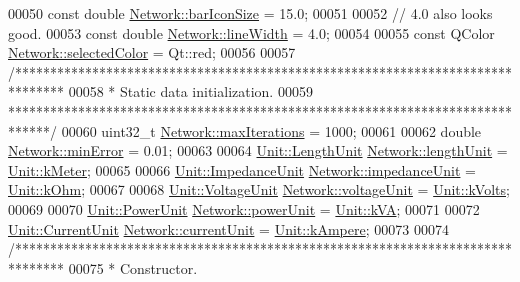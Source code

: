 \begin{DoxyCode}
00050 \textcolor{keyword}{const} \textcolor{keywordtype}{double} \hyperlink{group___models_gaa334bbc93b3fde219840e95e23198b53}{Network::barIconSize} = 15.0;
00051 
00052 \textcolor{comment}{// 4.0 also looks good.}
00053 \textcolor{keyword}{const} \textcolor{keywordtype}{double} \hyperlink{group___models_ga3f810634c9908d62d33a1ab09a76c147}{Network::lineWidth} = 4.0;
00054 
00055 \textcolor{keyword}{const} QColor \hyperlink{group___models_gaa9e21b8e2a24b0495e776a51e1aeed94}{Network::selectedColor} = Qt::red;
00056 
00057 \textcolor{comment}{/*******************************************************************************}
00058 \textcolor{comment}{ * Static data initialization.}
00059 \textcolor{comment}{ ******************************************************************************/}
00060 uint32\_t \hyperlink{group___models_ga318dee060bc577eacd67d332efbbe1b2}{Network::maxIterations} = 1000;
00061 
00062 \textcolor{keywordtype}{double} \hyperlink{group___models_gabcdc973129d3dda7572b7a1c388da1b5}{Network::minError} = 0.01;
00063 
00064 \hyperlink{class_unit_a8c8921f7b225ad6063b1cb573425b9a0}{Unit::LengthUnit} \hyperlink{group___models_gae46c0e2bf39b343875e3c69066fe2652}{Network::lengthUnit} = 
      \hyperlink{class_unit_a8c8921f7b225ad6063b1cb573425b9a0abfa41ebe7ee649a1f02c9b8ae570434b}{Unit::kMeter};
00065 
00066 \hyperlink{class_unit_a3747e779c805df24a71961290be3fbdf}{Unit::ImpedanceUnit} \hyperlink{group___models_ga5f3d72699a723c64a89d22e34df708ff}{Network::impedanceUnit} = 
      \hyperlink{class_unit_a3747e779c805df24a71961290be3fbdfa6b9c74d1763eefbaf751eeecff0bd9da}{Unit::kOhm};
00067 
00068 \hyperlink{class_unit_a55b07dfa9457e1eca2c7194fe0cfc3c1}{Unit::VoltageUnit} \hyperlink{group___models_gacde031ef95f5c05565ee35769f2ed89e}{Network::voltageUnit} = 
      \hyperlink{class_unit_a55b07dfa9457e1eca2c7194fe0cfc3c1aa54b2473993a702a3923525765bd6e4c}{Unit::kVolts};
00069 
00070 \hyperlink{class_unit_ace265ae255370ccacfd5370337572c3b}{Unit::PowerUnit} \hyperlink{group___models_ga9504015bc566f4a3d3b4d4a86000293b}{Network::powerUnit} = \hyperlink{class_unit_ace265ae255370ccacfd5370337572c3ba72b181a842ae2759488a2fa1410d3696}{Unit::kVA};
00071 
00072 \hyperlink{class_unit_a0794cf6c9682f48296dd4a5315389787}{Unit::CurrentUnit} \hyperlink{group___models_gac6a26db5fef2b1dd2a00faf6340d1702}{Network::currentUnit} = 
      \hyperlink{class_unit_a0794cf6c9682f48296dd4a5315389787a368a3c470f0b590a6100dda717a7dd4f}{Unit::kAmpere};
00073 
00074 \textcolor{comment}{/*******************************************************************************}
00075 \textcolor{comment}{ * Constructor.}

\end{DoxyCode}
